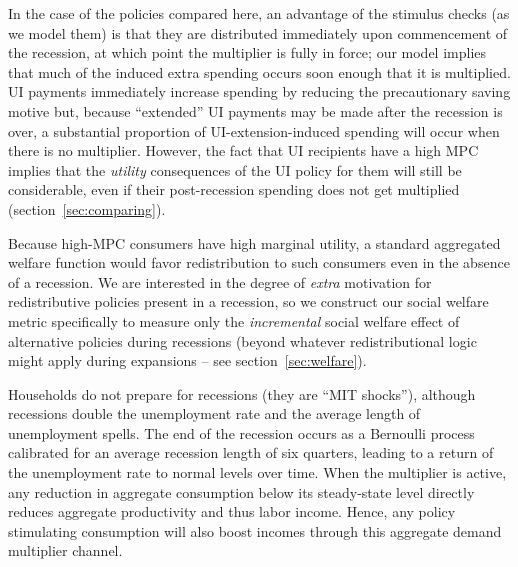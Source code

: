 \documentclass[\econtexRoot/HAFiscal]{subfiles}
\begin{document}
In the case of the policies compared here, an advantage of the stimulus checks (as we model them) is that they are distributed immediately upon commencement of the recession, at which point the multiplier is fully in force; our model implies that much of the induced extra spending occurs soon enough that it is multiplied.  UI payments immediately increase spending by reducing the precautionary saving motive but, because ``extended'' UI payments may be made after the recession is over, a substantial proportion of UI-extension-induced spending will occur when there is no multiplier.  However, the fact that UI recipients have a high MPC implies that the \textit{utility} consequences of the UI policy for them will still be considerable, even if their post-recession spending does not get multiplied (section~\ref{sec:comparing}).

Because high-MPC consumers have high marginal utility, a standard aggregated welfare function would favor redistribution to such consumers even in the absence of a recession. We are interested in the degree of \textit{extra} motivation for redistributive policies present in a recession, so we construct our social welfare metric specifically to measure only the \textit{incremental} social welfare effect of alternative policies during recessions (beyond whatever redistributional logic might apply during expansions -- see section~\ref{sec:welfare}).


Households do not prepare for recessions (they are ``MIT shocks''), although recessions double the unemployment rate and the average length of unemployment spells. The end of the recession occurs as a Bernoulli process calibrated for an average recession length of six quarters, leading to a return of the unemployment rate to normal levels over time. When the multiplier is active, any reduction in aggregate consumption below its steady-state level directly reduces aggregate productivity and thus labor income. Hence, any policy stimulating consumption will also boost incomes through this aggregate demand multiplier channel.

\end{document}
